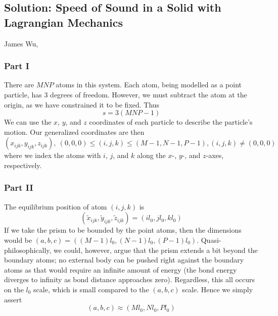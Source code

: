 \documentclass[letterpaper,12pt]{article}
\begin{document}
\begin{center}
    \subsection*{Solution: Speed of Sound in a Solid with Lagrangian Mechanics}
    James Wu, 
\end{center}

\begin{flushleft}

    \subsubsection*{Part I}
    There are $MNP$ atoms in this system. Each atom, being modelled as a point particle, has 3 degrees of freedom. However, we must subtract the atom at the origin, as we have constrained it to be fixed. Thus
    $$\boxed{s = 3(MNP - 1)}$$
    We can use the $x$, $y$, and $z$ coordinates of each particle to describe the particle's motion. Our generalized coordinates are then
    $$\boxed{\left(x_{ijk}, y_{ijk}, z_{ijk}\right), \: (0,0,0) \leq (i,j,k) \leq (M-1, N-1, P-1), (i,j,k) \neq (0,0,0)}$$
    where we index the atoms with $i$, $j$, and $k$ along the $x$-, $y$-, and $z$-axes, respectively.

    \subsubsection*{Part II}
    The equilibrium position of atom $(i,j,k)$ is
    $$\boxed{\left(\tilde{x}_{ijk}, \tilde{y}_{ijk}, \tilde{z}_{ijk}\right) = \left(il_0, jl_0, kl_0\right)}$$
    If we take the prism to be bounded by the point atoms, then the dimensions would be $(a,b,c) = ((M-1)l_0,(N-1)l_0,(P-1)l_0)$. Quasi-philosophically, we could, however, argue that the prism extends a bit beyond the boundary atoms; no external body can be pushed right against the boundary atoms as that would require an infinite amount of energy (the bond energy diverges to infinity as bond distance approaches zero). Regardless, this all occurs on the $l_0$ scale, which is small compared to the $(a,b,c)$ scale. Hence we simply assert
    $$\boxed{(a,b,c) \approx (Ml_0,Nl_0,Pl_0)}$$


\end{flushleft}
\end{document}
